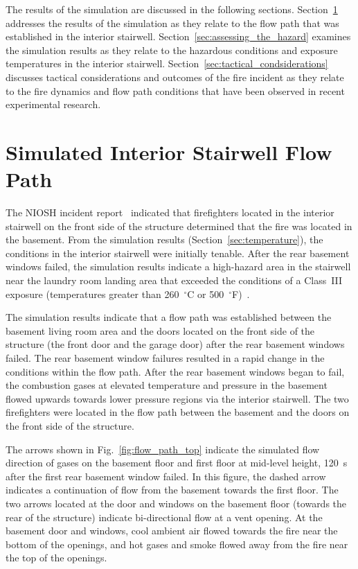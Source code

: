 \documentclass[12pt,oneside]{book}
\begin{document}
The results of the simulation are discussed in the following sections. Section~\ref{sec:simulated_flow_path} addresses the results of the simulation as they relate to the flow path that was established in the interior stairwell. Section~\ref{sec:assessing_the_hazard} examines the simulation results as they relate to the hazardous conditions and exposure temperatures in the interior stairwell. Section~\ref{sec:tactical_condsiderations} discusses tactical considerations and outcomes of the fire incident as they relate to the fire dynamics and flow path conditions that have been observed in recent experimental research.

\section{Simulated Interior Stairwell Flow Path}
\label{sec:simulated_flow_path}

The NIOSH incident report~\cite{NIOSH:Bowyer2} indicated that firefighters located in the interior stairwell on the front side of the structure determined that the fire was located in the basement. From the simulation results (Section~\ref{sec:temperature}), the conditions in the interior stairwell were initially tenable. After the rear basement windows failed, the simulation results indicate a high-hazard area in the stairwell near the laundry room landing area that exceeded the conditions of a Class~III exposure (temperatures greater than 260~$^{\circ}$C or 500~$^{\circ}$F)~\cite{Donnelly2006}.

The simulation results indicate that a flow path was established between the basement living room area and the doors located on the front side of the structure (the front door and the garage door) after the rear basement windows failed. The rear basement window failures resulted in a rapid change in the conditions within the flow path. After the rear basement windows began to fail, the combustion gases at elevated temperature and pressure in the basement flowed upwards towards lower pressure regions via the interior stairwell. The two firefighters were located in the flow path between the basement and the doors on the front side of the structure.

The arrows shown in Fig.~\ref{fig:flow_path_top} indicate the simulated flow direction of gases on the basement floor and first floor at mid-level height, 120~s after the first rear basement window failed. In this figure, the dashed arrow indicates a continuation of flow from the basement towards the first floor. The two arrows located at the door and windows on the basement floor (towards the rear of the structure) indicate bi-directional flow at a vent opening. At the basement door and windows, cool ambient air flowed towards the fire near the bottom of the openings, and hot gases and smoke flowed away from the fire near the top of the openings.
\end{document}
